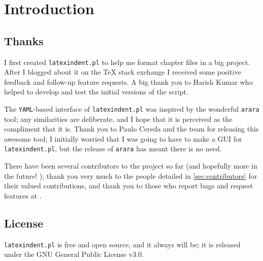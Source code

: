 \section{Introduction}

\subsection{Thanks}
	I first created \texttt{latexindent.pl} to help me format chapter files in a big project.
	After I blogged about it on the \TeX{} stack exchange \cite{cmhblog} I received some positive feedback and follow-up feature requests.
	A big thank you to Harish Kumar \cite{harish} who helped to develop and test the initial versions of the script.

	The \texttt{YAML}-based interface of \texttt{latexindent.pl} was inspired by the wonderful \texttt{arara} tool; any similarities are deliberate, and I hope that it is perceived as the compliment that it is.
	Thank you to Paulo Cereda and the team for releasing this awesome tool; I initially worried that I was going to have to make a GUI for \texttt{latexindent.pl}, but the release of \texttt{arara} has meant there is no need.

	There have been several contributors to the project so far (and hopefully more in the future!
	); thank you very much to the people detailed in \vref{sec:contributors}
	for their valued contributions, and thank you to those who report bugs and request features
	at \cite{latexindent-home}.

\subsection{License}
	\texttt{latexindent.pl} is free and open source, and it always will be; it is released under the GNU General Public License v3.0.

